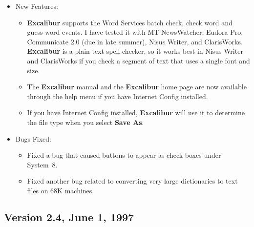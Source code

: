 ﻿\documentclass[11pt,titlepage]{article}
\newcommand{\ex}{\textbf{Excalibur}}
\begin{document}
\begin{itemize}
\item New Features:

  \begin{itemize}

  \item \ex{} supports the Word Services batch check, check word and
    guess word events.  I have tested it with MT-NewsWatcher, Eudora
    Pro, Communicate 2.0 (due in late summer), Nisus Writer, and
    ClarisWorks.  \ex{} is a plain text spell checker, so it works
    best in Nisus Writer and ClarisWorks if you check a segment of
    text that uses a single font and size.

  \item The \ex{} manual and the \ex{} home page are now available
    through the help menu if you have Internet Config installed.

  \item If you have Internet Config installed, \ex{} will use it to
    determine the file type when you select \textbf{Save As}.

  \end{itemize}

\item Bugs Fixed:

  \begin{itemize}

  \item Fixed a bug that caused buttons to appear as check boxes under
    System~8.

  \item Fixed another bug related to converting very large
    dictionaries to text files on 68K machines.

  \end{itemize}

\end{itemize}


\subsection{Version 2.4, June 1, 1997}
\end{document}
